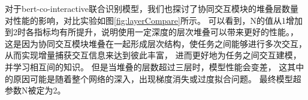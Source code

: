 对于bert-co-interactive联合识别模型，我们也探讨了协同交互模块的堆叠层数量对性能的影响，对比实验如图\ref{fig:layerCompare}所示。
可以看到，N的值从1增加到2时各指标均有所提升，说明使用一定深度的层次堆叠可以带来更好的性能。，
这是因为协同交互模块堆叠在一起形成层次结构，使任务之间能够进行多次交互，从而实现增量捕获交互信息来达到彼此丰富，
进而更好地为任务之间交互建模，并学习相互间的知识。 
但是当堆叠的层数超过三层时，模型性能会变差，
这其中的原因可能是随着整个网络的深入，出现梯度消失或过度拟合问题。
最终模型超参数N被定为2。

\begin{figure}[htbp]
  \\
\end{figure}
